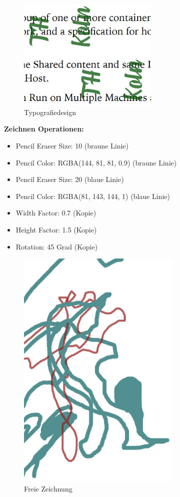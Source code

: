 \begin{figure}[!htbp]
	\centering
	\includegraphics[width=0.6\textwidth]{"images/text-ops.png"}
	\caption{Typografiedesign}
	\label{fig:text-ops}
\end{figure}

\textbf{Zeichnen Operationen:}
\begin{itemize}
	\item Pencil Eraser Size: 10 (braune Linie)
	\item Pencil Color: RGBA(144, 81, 81, 0.9) (braune Linie)
	\item Pencil Eraser Size: 20 (blaue Linie)
	\item Pencil Color: RGBA(81, 143, 144, 1) (blaue Linie)
	\item Width Factor: 0.7 (Kopie)
	\item Height Factor: 1.5 (Kopie)
	\item Rotation: 45 Grad (Kopie)
\end{itemize}

\begin{figure}[!htbp]
	\centering
	\includegraphics[width=0.7\textwidth]{"images/draw-ops.png"}
	\caption{Freie Zeichnung}
	\label{fig:draw-ops}
\end{figure}

